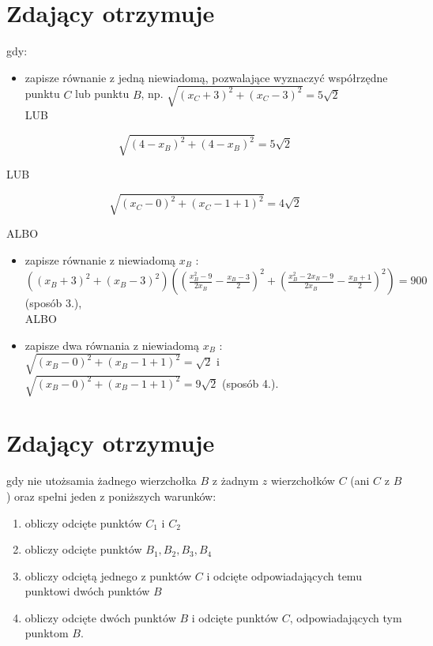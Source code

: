 \documentclass[10pt]{article}
\begin{document}
\section*{Zdający otrzymuje}
gdy:

\begin{itemize}
  \item zapisze równanie z jedną niewiadomą, pozwalające wyznaczyć współrzędne punktu $C$ lub punktu $B$, np. $\sqrt{\left(x_{C}+3\right)^{2}+\left(x_{C}-3\right)^{2}}=5 \sqrt{2}$\\
LUB
\end{itemize}

$$
\sqrt{\left(4-x_{B}\right)^{2}+\left(4-x_{B}\right)^{2}}=5 \sqrt{2}
$$

LUB

$$
\sqrt{\left(x_{C}-0\right)^{2}+\left(x_{C}-1+1\right)^{2}}=4 \sqrt{2}
$$

ALBO

\begin{itemize}
  \item zapisze równanie z niewiadomą $x_{B}$ :\\
$\left(\left(x_{B}+3\right)^{2}+\left(x_{B}-3\right)^{2}\right)\left(\left(\frac{x_{B}^{2}-9}{2 x_{B}}-\frac{x_{B}-3}{2}\right)^{2}+\left(\frac{x_{B}^{2}-2 x_{B}-9}{2 x_{B}}-\frac{x_{B}+1}{2}\right)^{2}\right)=900$ (sposób 3.),\\
ALBO
  \item zapisze dwa równania z niewiadomą $x_{B}$ :\\
$\sqrt{\left(x_{B}-0\right)^{2}+\left(x_{B}-1+1\right)^{2}}=\sqrt{2}$ i $\sqrt{\left(x_{B}-0\right)^{2}+\left(x_{B}-1+1\right)^{2}}=9 \sqrt{2}$ (sposób 4.).
\end{itemize}

\section*{Zdający otrzymuje}
gdy nie utożsamia żadnego wierzchołka $B$ z żadnym $z$ wierzchołków $C$ (ani $C$ z $B$ ) oraz spełni jeden z poniższych warunków:

\begin{enumerate}
  \item obliczy odcięte punktów $C_{1}$ i $C_{2}$
  \item obliczy odcięte punktów $B_{1}, B_{2}, B_{3}, B_{4}$
  \item obliczy odciętą jednego z punktów $C$ i odcięte odpowiadających temu punktowi dwóch punktów $B$
  \item obliczy odcięte dwóch punktów $B$ i odcięte punktów $C$, odpowiadających tym punktom $B$.
\end{enumerate}
\end{document}
